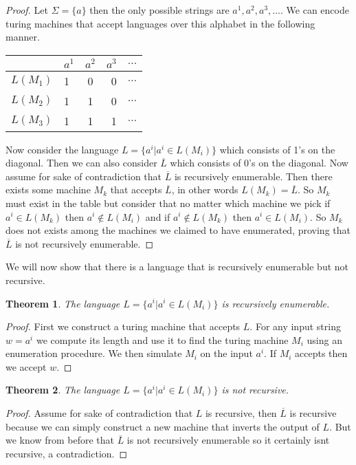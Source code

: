 \documentclass[11pt]{exam}
\newtheorem{theorem}{Theorem}[section]
\begin{document}
\begin{proof}
Let $\Sigma = \{a\}$ then the only possible strings are $a^1,a^2,a^3, \dots$. We can encode turing machines that accept languages over this alphabet in the following manner.

\begin{center}
\begin{tabular}{l | l c r r}
& $a^1$ & $a^2$ & $a^3$ & $\dots$\\ 
\hline
$L(M_1)$ & 1 & 0 &0 & $\dots$\\ 
$L(M_2)$ & 1 & 1 & 0 & $\dots$\\
$L(M_3)$ & 1 & 1 & 1  & $\dots$\\
\end{tabular}
\end{center}

Now consider the language $L = \{a^i | a^i \in L(M_i)\}$ which consists of 1's on the diagonal. Then we can also consider $\overline{L}$ which consists of 0's on the diagonal. Now assume for sake of contradiction that $\overline{L}$ is recursively enumerable. Then there exists some machine $M_k$ that accepts $\overline{L}$, in other words $L(M_k) = \overline{L}$. So $M_k$ must exist in the table but consider that no matter which machine we pick if $a^i \in L(M_k)$ then $a^i \notin L(M_i)$ and if $a^i \notin L(M_k)$ then $a^i \in L(M_i)$. So $M_k$ does not exists among the machines we claimed to have enumerated, proving that $\overline{L}$ is not recursively enumerable.
\end{proof}

We will now show that there is a language that is recursively enumerable but not recursive.

\begin{theorem}
The language $L = \{a^i | a^i \in L(M_i)\}$ is recursively enumerable.  
\end{theorem}

\begin{proof}
First we construct a turing machine that accepts $L$. For any input string $w = a^i$ we compute its length and use it to find the turing machine $M_i$ using an enumeration procedure. We then simulate $M_i$ on the input $a^i$. If $M_i$ accepts then we accept $w$.
\end{proof}

\begin{theorem}
The language $L = \{a^i | a^i \in L(M_i)\}$ is not recursive. 
\end{theorem}
\begin{proof}
Assume for sake of contradiction that $L$ is recursive, then  $\overline{L}$ is recursive because we can simply construct a new machine that inverts the output of $L$. But we know from before that $\overline{L}$ is not recursively enumerable so it certainly isnt recursive, a contradiction.
\end{proof}
\end{document}
